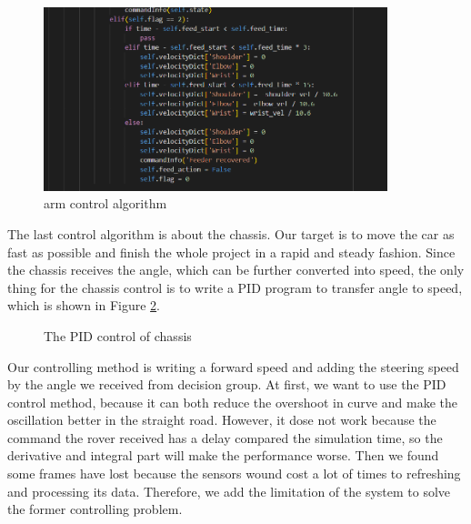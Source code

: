 \begin{figure}[htbp]
    \centering
    \includegraphics[width=10cm]{implementation/img_shi/arm_control.png}
    \caption{arm control algorithm}
    \label{fig:arm_control}
\end{figure}

The last control algorithm is about the chassis. Our target is to move the car as fast as possible and finish the whole project in a rapid and steady fashion. Since the chassis receives the angle, which can be further converted into speed, the only thing for the chassis control is to write a PID program to transfer angle to speed, which is shown in Figure \ref{fig:PID_control}.

\begin{figure}[htbp]
    \centering
    \caption{The PID control of chassis}
    \label{fig:PID_control}
\end{figure}

Our controlling method is writing a forward speed and adding the steering speed by the angle we received from decision group. At first, we want to use the PID control method, because it can both reduce the overshoot in curve and make the oscillation better in the straight road. However, it dose not work because the command the rover received has a delay compared the simulation time, so the derivative and integral part will make the performance worse.  Then we found some frames have lost because the sensors wound cost a lot of times to refreshing and processing its data. Therefore, we add the limitation of the system to solve the former controlling problem.

